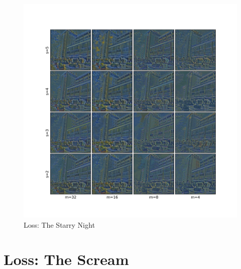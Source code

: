 \begin{figure}[H]
	\centering
	\includegraphics[width=1.00\textwidth]{resources/content/experiments/fast_image_grid_experiment1.jpg}
	\caption{Loss: The Starry Night}
	\label{img:loss_the_starry_night}
\end{figure}

\pagebreak

\section{Loss: The Scream}

